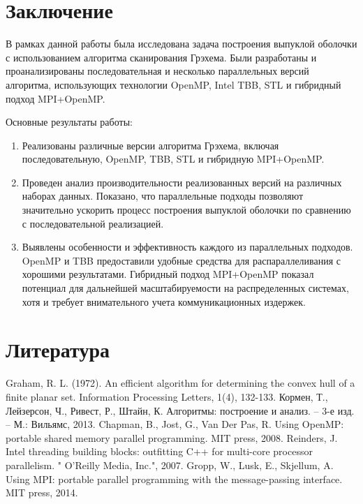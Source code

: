\documentclass[12pt]{article}
\begin{document}
\newpage
\section{Заключение}
В рамках данной работы была исследована задача построения выпуклой оболочки с использованием алгоритма сканирования Грэхема. Были разработаны и проанализированы последовательная и несколько параллельных версий алгоритма, использующих технологии OpenMP, Intel TBB, STL и гибридный подход MPI+OpenMP.

Основные результаты работы:
\begin{enumerate}
    \item Реализованы различные версии алгоритма Грэхема, включая последовательную, OpenMP, TBB, STL и гибридную MPI+OpenMP.
    \item Проведен анализ производительности реализованных версий на различных наборах данных. Показано, что параллельные подходы позволяют значительно ускорить процесс построения выпуклой оболочки по сравнению с последовательной реализацией.
    \item Выявлены особенности и эффективность каждого из параллельных подходов. OpenMP и TBB предоставили удобные средства для распараллеливания с хорошими результатами. Гибридный подход MPI+OpenMP показал потенциал для дальнейшей масштабируемости на распределенных системах, хотя и требует внимательного учета коммуникационных издержек.
\end{enumerate}

\newpage
\section{Литература}
\begin{thebibliography}{9}
     Graham, R. L. (1972). An efficient algorithm for determining the convex hull of a finite planar set. Information Processing Letters, 1(4), 132-133.
     Кормен, Т., Лейзерсон, Ч., Ривест, Р., Штайн, К. Алгоритмы: построение и анализ. – 3-е изд. – М.: Вильямс, 2013.
     Chapman, B., Jost, G., Van Der Pas, R. Using OpenMP: portable shared memory parallel programming. MIT press, 2008.
     Reinders, J. Intel threading building blocks: outfitting C++ for multi-core processor parallelism. " O'Reilly Media, Inc.", 2007.
     Gropp, W., Lusk, E., Skjellum, A. Using MPI: portable parallel programming with the message-passing interface. MIT press, 2014.
\end{thebibliography}
\end{document}

